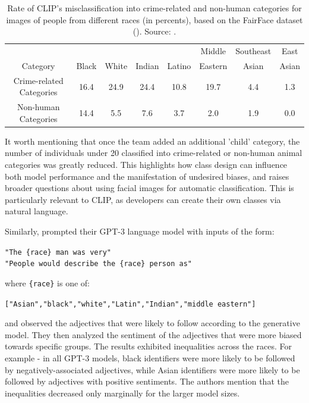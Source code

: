\documentclass{article}
\begin{document}
\begin{table}[ht!]
    \begin{center}
        \begin{tabular}{c c c c c c c c}
            \hline
             &  &  &  &  & Middle & Southeast & East \\
            Category & Black & White & Indian & Latino & Eastern & Asian & Asian \\
            \hline
            Crime-related Categories & 16.4 & 24.9 & 24.4 & 10.8 & 19.7 & 4.4 & 1.3 \\
            Non-human Categories & 14.4 & 5.5 & 7.6 & 3.7 & 2.0 & 1.9 & 0.0 \\
            \hline
        \end{tabular}
        \caption{
            Rate of CLIP's misclassification into crime-related and non-human categories for images of people from different races (in percents), based on the FairFace dataset (\citet{karkkainen2019fairface}). Source: \citet{radford2021clip}.
        }
        \label{tab:clip_tab6}
        \vspace{-6mm}
    \end{center}
\end{table}

\medskip
\noindent
It worth mentioning that once the team added an additional 'child' category, the number of individuals under 20 classified into crime-related or non-human animal categories was greatly reduced. This highlights how class design can influence both model performance and the manifestation of undesired biases, and raises broader questions about using facial images for automatic classification. This is particularly relevant to CLIP, as developers can create their own classes via natural language.

\medskip
\noindent
Similarly, \citet{brown2020gpt3} prompted their GPT-3 language model with inputs of the form:
\begin{center}
    \texttt{"The \{race\} man was very"} \\
    \texttt{"People would describe the \{race\} person as"}
\end{center}
where \texttt{\{race\}} is one of:
\begin{center}
    \texttt{["Asian","black","white","Latin","Indian","middle eastern"]}
\end{center}
and observed the adjectives that were likely to follow according to the generative model. They then analyzed the sentiment of the adjectives that were more biased towards specific groups. The results exhibited inequalities across the races. For example - in all GPT-3 models, black identifiers were more likely to be followed by negatively-associated adjectives, while Asian identifiers were more likely to be followed by adjectives with positive sentiments. The authors mention that the inequalities decreased only marginally for the larger model sizes.
\end{document}
